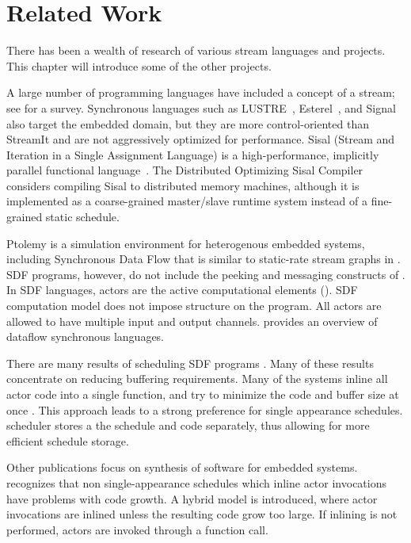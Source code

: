 \section{Related Work}

There has been a wealth of research of various stream languages
and projects.  This chapter will introduce some of the other
projects.

A large number of programming languages have included a concept of
a stream; see \cite{survey97} for a survey.  Synchronous languages
such as LUSTRE~\cite{lustre}, Esterel~\cite{esterel92}, and
Signal~\cite{signal} also target the embedded domain, but they are
more control-oriented than StreamIt and are not aggressively
optimized for performance.  Sisal (Stream and Iteration in a
Single Assignment Language) is a high-performance, implicitly
parallel functional language~\cite{sisal}.  The Distributed
Optimizing Sisal Compiler~\cite{sisal} considers compiling Sisal
to distributed memory machines, although it is implemented as a
coarse-grained master/slave runtime system instead of a
fine-grained static schedule.

Ptolemy \cite{ptolemyoverview} is a simulation environment for
heterogenous embedded systems, including Synchronous Data Flow
that is similar to static-rate stream graphs in {\StreamIt}.  SDF
programs, however, do not include the peeking and messaging
constructs of {\StreamIt}.  In SDF languages, actors are the active
computational elements ({\filters}).  SDF computation model does not
impose structure on the program.  All actors are allowed to have
multiple input and output channels.  \cite{benveniste93dataflow}
provides an overview of dataflow synchronous languages.

There are many results of scheduling SDF programs \cite{leesdf}.
Many of these results concentrate on reducing buffering
requirements. Many of the systems inline all actor code into a
single function, and try to minimize the code and buffer size at
once \cite{bhattacharyya99synthesis}.  This approach leads to a
strong preference for single appearance schedules.  {\StreamIt}
scheduler stores a the schedule and {\filter} code separately, thus
allowing for more efficient schedule storage.

Other publications focus on synthesis of software for embedded
systems. \cite{bhat1999x1} recognizes that non single-appearance
schedules which inline actor invocations have problems with code
growth.  A hybrid model is introduced, where actor invocations are
inlined unless the resulting code grow too large. If inlining is
not performed, actors are invoked through a function call.

